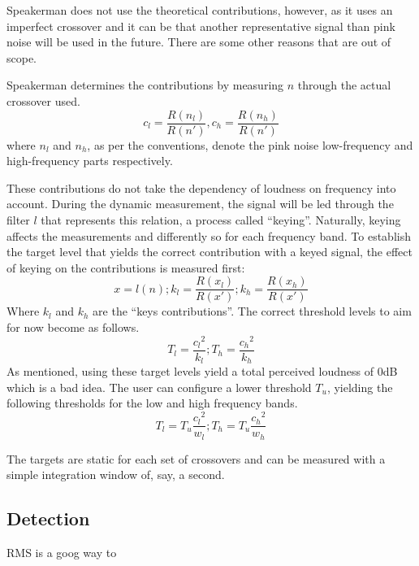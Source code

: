 \documentclass[11pt]{article}
\begin{document}
Speakerman does not use the theoretical contributions, however, as it uses an imperfect crossover and it can be that another representative signal than pink noise will be used in the future.
There are some other reasons that are out of scope.

Speakerman determines the contributions by measuring $n$ through the actual crossover used.
    \[
        c_l = \dfrac{R(n_l)}{R(n')} , c_h = \dfrac{R(n_h)}{R(n')}
    \]
where $n_l$ and $n_h$, as per the conventions, denote the pink noise low-frequency and high-frequency parts respectively.

These contributions do not take the dependency of loudness on  frequency into account.
During the dynamic measurement, the signal will be led through the filter $l$ that represents this relation, a process called ``keying''.
Naturally, keying affects the measurements and differently so for each frequency band.
To establish the target level that yields the correct contribution with a keyed signal, the effect of keying on the contributions is measured first:
\[
    x = l(n) ;
    k_l = \dfrac{R(x_l)}{R(x')} ; k_h = \dfrac{R(x_h)}{R(x')}
\]
Where $k_l$ and $k_h$ are the ``keys contributions''.
The correct threshold levels to aim for now become as follows.
\[
    T_l = \dfrac{{c_l}^2}{k_l} ; T_h = \dfrac{{c_h}^2}{k_h}
\]
As mentioned, using these target levels yield a total perceived loudness of 0dB which is a bad idea.
The user can configure a lower threshold $T_u$, yielding the following thresholds for the low and high frequency bands.
\[
    T_l = T_u \dfrac{{c_l}^2}{w_l} ; T_h = T_u \dfrac{{c_h}^2}{w_h}
\]

The targets are static for each set of crossovers and can be measured with a simple integration window of, say, a second.

\subsection{Detection}\label{subsec:detection}

RMS is a goog way to
\end{document}
